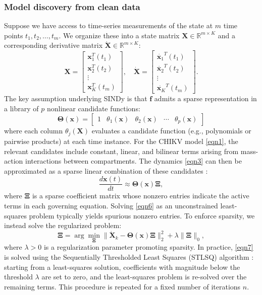 \documentclass[9pt]{article}
\newcommand\bfX{\mathbf{X}}
\newcommand\bff{\mathbf{f}}
\newcommand\bfx{\mathbf{x}}
\numberwithin{equation}{section}
\begin{document}
\subsubsection{Model discovery from clean data}
Suppose we have access to time-series measurements of the state at $m$ time points $t_1, t_2, \ldots, t_m$. We organize these into a state matrix $\bfX \in \mathbb{R}^{m \times K}$ and a corresponding derivative matrix $\dot{\bfX} \in \mathbb{R}^{m \times K}$:
\begin{equation}\label{eqn4}
    \bfX=
    \begin{bmatrix}
        \bfx_1^T(t_1)\\\bfx_2^T(t_2)\\\vdots\\\bfx_K^T(t_m)
    \end{bmatrix},
    \quad
    \dot{\bfX}=
    \begin{bmatrix}
        \dot{\bfx_1}^T(t_1)\\\dot{\bfx_2}^T(t_2)\\\vdots\\\dot{\bfx_K}^T(t_m)
    \end{bmatrix}.
\end{equation}
The key assumption underlying SINDy is that $\bff$ admits a sparse representation in a library of $p$ nonlinear candidate functions:
\begin{equation}\label{eqn5}
    \boldsymbol{\Theta}(\bfx)=
    \begin{bmatrix} 
        1&\theta_1(\bfx)&\theta_2(\bfx)&\cdots&\theta_p(\bfx)
    \end{bmatrix}
\end{equation}
where each column $\theta_j(\bfX)$ evaluates a candidate function (e.g., polynomials or pairwise products) at each time instance. For the CHIKV model \eqref{eqn1}, the relevant candidates include constant, linear, and bilinear terms arising from mass-action interactions between compartments.
The dynamics \eqref{eqn3} can then be approximated as a sparse linear combination of these candidates :
\begin{equation}\label{eqn6}
    \frac{d\bfx(t)}{dt}\approx\boldsymbol{\Theta}(\bfx)\boldsymbol{\Xi},
\end{equation}
where $\boldsymbol{\Xi}$ is a sparse coefficient matrix whose nonzero entries indicate the active terms in each governing equation. Solving \eqref{eqn6} as an unconstrained least-squares problem typically yields spurious nonzero entries. To enforce sparsity, we instead solve the regularized problem:
\begin{equation}\label{eqn7}
    \boldsymbol{\Xi}=\arg\min_{\boldsymbol{\Xi}}\|\dot{\bfX}_k- \boldsymbol{\Theta}(\bfx)\boldsymbol{\Xi}\|_2^2 + \lambda\|\boldsymbol{\Xi}\|_0,
\end{equation}
where $\lambda > 0$ is a regularization parameter promoting sparsity. In practice, \eqref{eqn7} is solved using the Sequentially Thresholded Least Squares (STLSQ) algorithm \cite{zhang}: starting from a least-squares solution, coefficients with magnitude below the threshold $\lambda$ are set to zero, and the least-squares problem is re-solved over the remaining terms. This procedure is repeated for a fixed number of iterations $n$.
\end{document}
